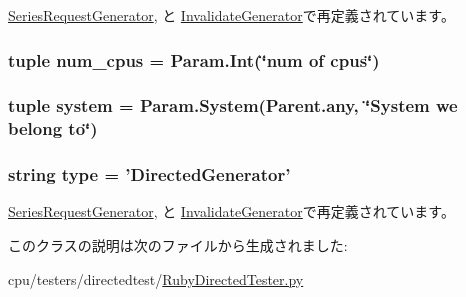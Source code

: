 \hyperlink{classRubyDirectedTester_1_1SeriesRequestGenerator_a17da7064bc5c518791f0c891eff05fda}{SeriesRequestGenerator}, と \hyperlink{classRubyDirectedTester_1_1InvalidateGenerator_a17da7064bc5c518791f0c891eff05fda}{InvalidateGenerator}で再定義されています。\hypertarget{classRubyDirectedTester_1_1DirectedGenerator_ab0bd6c2c9c8cc012f980111834ffc3a9}{
\subsubsection[{num\_\-cpus}]{\setlength{\rightskip}{0pt plus 5cm}tuple {\bf num\_\-cpus} = Param.Int(\char`\"{}num of cpus\char`\"{})}}
\label{classRubyDirectedTester_1_1DirectedGenerator_ab0bd6c2c9c8cc012f980111834ffc3a9}
\hypertarget{classRubyDirectedTester_1_1DirectedGenerator_ab737471139f5a296e5b26e8a0e1b0744}{
\subsubsection[{system}]{\setlength{\rightskip}{0pt plus 5cm}tuple {\bf system} = Param.System(Parent.any, \char`\"{}System we belong to\char`\"{})}}
\label{classRubyDirectedTester_1_1DirectedGenerator_ab737471139f5a296e5b26e8a0e1b0744}
\hypertarget{classRubyDirectedTester_1_1DirectedGenerator_acce15679d830831b0bbe8ebc2a60b2ca}{
\subsubsection[{type}]{\setlength{\rightskip}{0pt plus 5cm}string {\bf type} = '{\bf DirectedGenerator}'}}
\label{classRubyDirectedTester_1_1DirectedGenerator_acce15679d830831b0bbe8ebc2a60b2ca}


\hyperlink{classRubyDirectedTester_1_1SeriesRequestGenerator_acce15679d830831b0bbe8ebc2a60b2ca}{SeriesRequestGenerator}, と \hyperlink{classRubyDirectedTester_1_1InvalidateGenerator_acce15679d830831b0bbe8ebc2a60b2ca}{InvalidateGenerator}で再定義されています。

このクラスの説明は次のファイルから生成されました:\begin{DoxyCompactItemize}
\item 
cpu/testers/directedtest/\hyperlink{RubyDirectedTester_8py}{RubyDirectedTester.py}\end{DoxyCompactItemize}
